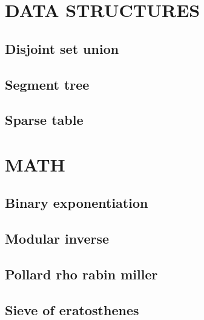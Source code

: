 \documentclass[11pt]{article}
\begin{document}
\section{DATA STRUCTURES}

\subsection{\texorpdfstring{Disjoint set union}{Disjoint set union}}


\subsection{\texorpdfstring{Segment tree}{Segment tree}}


\subsection{\texorpdfstring{Sparse table}{Sparse table}}


\section{MATH}

\subsection{\texorpdfstring{Binary exponentiation}{Binary exponentiation}}


\subsection{\texorpdfstring{Modular inverse}{Modular inverse}}


\subsection{\texorpdfstring{Pollard rho rabin miller}{Pollard rho rabin miller}}


\subsection{\texorpdfstring{Sieve of eratosthenes}{Sieve of eratosthenes}}

\end{document}
